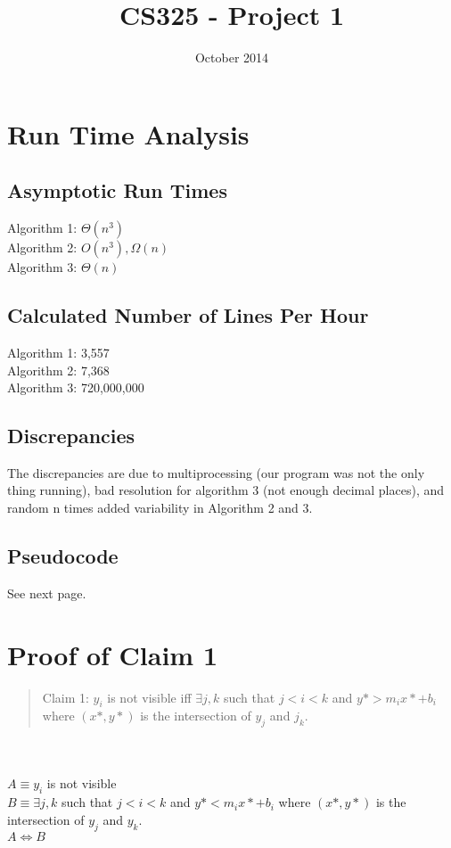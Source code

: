 \documentclass{article}
\title{CS325 - Project 1}
\author{Group #6\\
William Jernigan, Alexander Merrill, Sean Rettig}
\date{October 2014}
\begin{document}
\maketitle

\section*{Run Time Analysis}
\subsection*{Asymptotic Run Times}
Algorithm 1: $\Theta(n^3)$\\
Algorithm 2: $O(n^3), \Omega(n)$\\
Algorithm 3: $\Theta(n)$
\subsection*{Calculated Number of Lines Per Hour}
Algorithm 1: 3,557\\
Algorithm 2: 7,368\\
Algorithm 3: 720,000,000
\subsection*{Discrepancies}
The discrepancies are due to multiprocessing (our program was not the only thing running), bad resolution for algorithm 3 (not enough decimal places), and random n times added variability in Algorithm 2 and 3.
\subsection*{Pseudocode}
See next page.
\pagebreak


\section*{Proof of Claim 1}

\begin{quote}
    Claim 1: $y_i$ is not visible iff $\exists j,k$ such that $j < i < k$ and $y* > m_i x* + b_i$ where $(x*,y*)$ is the intersection of $y_j$ and $j_k$.
\end{quote}\\
\\
$A \equiv y_i$ is not visible\\
$B \equiv \exists j,k$ such that $j < i < k$ and $y* < m_i x* + b_i$ where $(x*,y*)$ is the intersection of $y_j$ and $y_k$.\\
$A \Leftrightarrow B$
\end{document}
